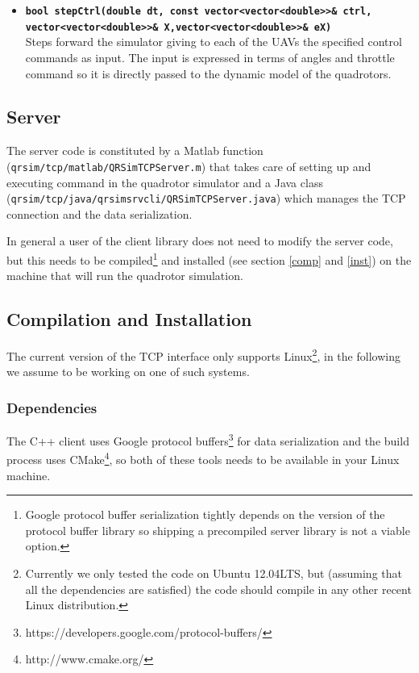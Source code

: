 \documentclass[a4paper,11pt]{report}
\begin{document}
\begin{itemize}
\item \textbf{\texttt{bool stepCtrl(double dt, const vector<vector<double>>\& ctrl,\\ \hspace*{80pt} vector<vector<double>>\& X,vector<vector<double>>\& eX)}}\\
Steps forward the simulator giving to each of the UAVs the specified control commands as input.
The input is expressed in terms of angles and throttle command so it is directly passed to the dynamic model of the quadrotors.

\end{itemize}

\subsection{Server}
The server code is constituted by a Matlab function (\texttt{qrsim/tcp/matlab/QRSimTCPServer.m}) that takes care of setting up and executing command in the quadrotor simulator and a Java class (\texttt{qrsim/tcp/java/qrsimsrvcli/QRSimTCPServer.java}) which manages the TCP connection and the data serialization.

In general a user of the client library does not need to modify the server code, but this needs to be compiled\footnote{Google protocol buffer serialization tightly depends on the version of the protocol buffer library so shipping a precompiled server library is not a viable option.} and installed (see section \ref{comp} and \ref{inst}) on the machine that will run the quadrotor simulation.

\subsection{Compilation and Installation}

The current version of the TCP interface only supports Linux\footnote{Currently we only tested the code on Ubuntu 12.04LTS, but (assuming that all the dependencies are satisfied) the code should compile in any other recent Linux distribution.}, in the following we assume to be working on one of such systems.

\subsubsection{Dependencies} 
The C++ client uses Google protocol buffers\footnote{https://developers.google.com/protocol-buffers/} for data serialization and the build process uses CMake\footnote{http://www.cmake.org/}, so both of these tools needs to be available in your Linux machine.
\end{document}

